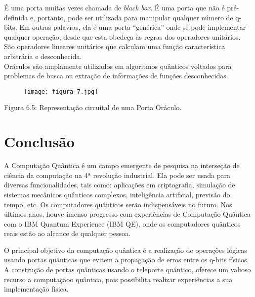 \documentclass[12pt, a4paper, oneside]{article}
\begin{document}
\par É uma porta muitas vezes chamada de \textit{black box}. É uma porta que não é pré-definida e,
portanto, pode ser utilizada para manipular qualquer número de q-bits. Em outras palavras,
ela é uma porta “genérica” onde se pode implementar qualquer operação, desde que esta
obedeça às regras dos operadores unitários.\\
São operadores lineares unitários que calculam uma função característica arbitrária e
desconhecida.\\
Oráculos são amplamente utilizados em algoritmos quânticos voltados para problemas
de busca ou extração de informações de funções desconhecidas.
\newpage

\begin{figure}
\centering 
\texttt{[image: figura\_7.jpg]} 
\end{figure}

\noindent Figura 6.5: Representação circuital de uma Porta Oráculo.
\section{Conclusão}

\par A Computação Quântica é um campo emergente de pesquisa na interseção de ciência da
computação na 4ª revolução industrial. Ela pode ser usada para diversas
funcionalidades, tais como: aplicações em criptografia, simulação de sistemas mecânicos
quânticos complexos, inteligência artificial, previsão do tempo, etc. Os computadores
quânticos serão indispensáveis no futuro. Nos últimos anos, houve imenso progresso com
experiências de Computação Quântica com o IBM Quantum Experience (IBM QE), onde os
computadores quânticos reais estão ao alcance de qualquer pessoa. 

\par O principal objetivo da computação quântica é a realização de operações lógicas usando portas quânticas que evitem a propagação de erros entre os q-bits físicos.
A construção de portas quânticas usando o teleporte quântico, oferece
um valioso recurso a computaçãoo quântica, pois possibilita realizar experiências a sua implementação física.
\end{document}
